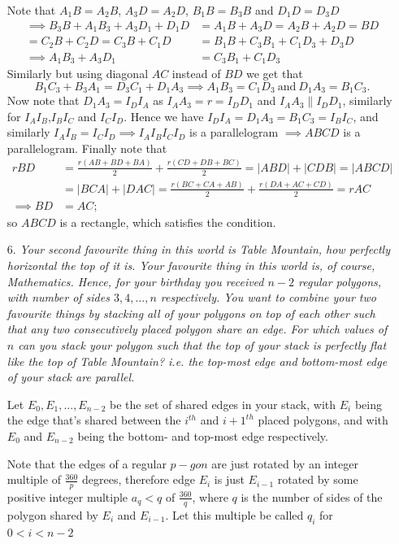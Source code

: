 \documentclass{article}
\begin{document}
\begin{enumerate}
Note that $A_1B = A_2B$, $A_3D = A_2D$, $B_1B = B_3B$ and $D_1D = D_3D$
\begin{align*}
	\implies B_3B+A_1B_3+A_3D_1+D_1D &= A_1B+A_3D = A_2B+A_2D = BD \\
	= C_2B+C_2D = C_3B+C_1D &= B_1B+C_3B_1+C_1D_3+D_3D \\
	\implies A_1B_3 + A_3D_1 &= C_3B_1+C_1D_3
\end{align*}
Similarly but using diagonal $AC$ instead of $BD$ we get that
\[ B_1C_3 + B_3A_1 = D_3C_1 + D_1A_3 \implies A_1B_3 = C_1D_3\ \text{and}\ D_1A_3 = B_1C_3. \]
Now note that $D_1A_3 = I_DI_A$ as $I_AA_3 = r = I_DD_1$ and $I_AA_3 \parallel I_DD_1$, similarly for $I_AI_B$,$I_BI_C$ and $I_CI_D$.
Hence we have $I_DI_A=D_1A_3=B_1C_3=I_BI_C$, and similarly $I_AI_B=I_CI_D \implies I_AI_BI_CI_D$ is a parallelogram $\implies ABCD$ is a parallelogram. 
Finally note that
\begin{align*}
	rBD &= \frac{r(AB+BD+BA)}{2} + \frac{r(CD+DB+BC)}{2} = |ABD|+|CDB| = |ABCD| \\
	&= |BCA|+|DAC| = \frac{r(BC+CA+AB)}{2} + \frac{r(DA+AC+CD)}{2} = rAC \\
	\implies BD &= AC;
\end{align*}
so $ABCD$ is a rectangle, which satisfies the condition.


\medskip
\item[6.] %
{\itshape Your second favourite thing in this world is Table Mountain, how perfectly horizontal the top of it is.
Your favourite thing in this world is, of course, Mathematics.
Hence, for your birthday you received $n-2$ regular polygons, with number of sides $3, 4, \dotsc, n$ respectively.
You want to combine your two favourite things by stacking all of your polygons on top of each other such that any two consecutively placed polygon share an edge.
For which values of $n$ can you stack your polygon such that the top of your stack is perfectly flat like the top of Table Mountain?
i.e. the top-most edge and bottom-most edge of your stack are parallel.}

Let $E_0,E_1,...,E_{n-2}$ be the set of shared edges in your stack, with $E_i$ being the edge that's shared between the $i^{th}$ and $i+1^{th}$ placed polygons, and with $E_0$ and $E_{n-2}$ being the bottom- and top-most edge respectively.

Note that the edges of a regular $p-gon$ are just rotated by an integer multiple of $\frac{360}{p}$ degrees, therefore edge $E_i$ is just $E_{i-1}$ rotated by some positive integer multiple $a_q < q$ of $\frac{360}{q}$, where $q$ is the number of sides of the polygon shared by $E_i$ and $E_{i-1}$.
Let this multiple be called $q_i$ for $0<i<n-2$


\end{enumerate}
\end{document}
